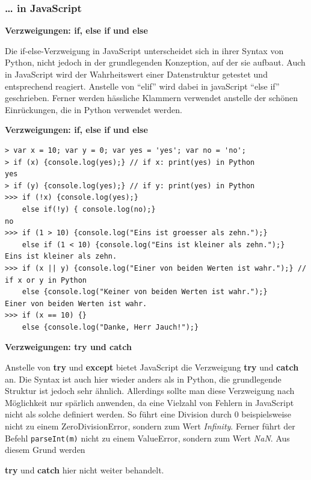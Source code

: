 \subsubsection{\ldots{} in JavaScript}

\vspace{0.5cm}\par\noindent\textbf{Verzweigungen: if, else if und else}\vspace{0.5cm}

Die if-else-Verzweigung in JavaScript unterscheidet sich in ihrer Syntax
von Python, nicht jedoch in der grundlegenden Konzeption, auf der sie
aufbaut. Auch in JavaScript wird der Wahrheitswert einer Datenstruktur
getestet und entsprechend reagiert. Anstelle von ``elif'' wird dabei in
javaScript ``else if'' geschrieben. Ferner werden hässliche Klammern
verwendet anstelle der schönen Einrückungen, die in Python verwendet
werden.




\vspace{0.5cm}\par\noindent\textbf{Verzweigungen: if, else if und else}\vspace{0.5cm}

\begin{verbatim}
> var x = 10; var y = 0; var yes = 'yes'; var no = 'no';
> if (x) {console.log(yes);} // if x: print(yes) in Python
yes
> if (y) {console.log(yes);} // if y: print(yes) in Python 
>>> if (!x) {console.log(yes);}
    else if(!y) { console.log(no);}
no
>>> if (1 > 10) {console.log("Eins ist groesser als zehn.");}
    else if (1 < 10) {console.log("Eins ist kleiner als zehn.");}
Eins ist kleiner als zehn.
>>> if (x || y) {console.log("Einer von beiden Werten ist wahr.");} // if x or y in Python
    else {console.log("Keiner von beiden Werten ist wahr.");}
Einer von beiden Werten ist wahr.
>>> if (x == 10) {}
    else {console.log("Danke, Herr Jauch!");}
\end{verbatim}




\vspace{0.5cm}\par\noindent\textbf{Verzweigungen: try und catch}\vspace{0.5cm}

Anstelle von \textbf{try} und \textbf{except} bietet JavaScript die
Verzweigung \textbf{try} und \textbf{catch} an. Die Syntax ist auch hier
wieder anders als in Python, die grundlegende Struktur ist jedoch sehr
ähnlich. Allerdings sollte man diese Verzweigung nach Möglichkeit nur
spärlich anwenden, da eine Vielzahl von Fehlern in JavaScript nicht als
solche definiert werden. So führt eine Division durch 0 beispielsweise
nicht zu einem ZeroDivisionError, sondern zum Wert \emph{Infinity}.
Ferner führt der Befehl
\texttt{parseInt(\textquotesingle{}m\textquotesingle{})} nicht zu einem
ValueError, sondern zum Wert \emph{NaN}. Aus diesem Grund werden
\vspace{0.5cm}\par\noindent\textbf{try} und \textbf{catch} hier nicht weiter behandelt.\vspace{0.5cm}




